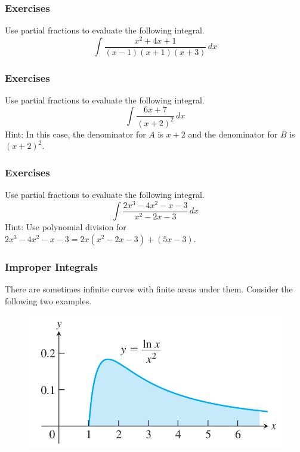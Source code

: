 \documentclass[xcolor=dvipsnames]{beamer}
\begin{document}
\begin{frame}
  \frametitle{Exercises}
  {\ubung} Use partial fractions to evaluate the following integral.
  \begin{equation}
    \label{eq:feirueho}
    \int\frac{x^{2}+4x+1}{(x-1)(x+1)(x+3)}\,dx
  \end{equation}
\end{frame}

\begin{frame}
  \frametitle{Exercises}
  {\ubung} Use partial fractions to evaluate the following integral.
  \begin{equation}
    \label{eq:ietahpha}
    \int\frac{6x+7}{\left(x+2\right)^{2}}\,dx
  \end{equation}
  Hint: In this case, the denominator for $A$ is $x+2$ and the
  denominator for $B$ is $\left(x+2\right)^{2}$.
\end{frame}

\begin{frame}
  \frametitle{Exercises}
  {\ubung} Use partial fractions to evaluate the following integral.
  \begin{equation}
    \label{eq:saeheing}
    \int\frac{2x^{3}-4x^{2}-x-3}{x^{2}-2x-3}\,dx
  \end{equation}
  Hint: Use polynomial division for
  $2x^{3}-4x^{2}-x-3=2x(x^{2}-2x-3)+(5x-3)$.
\end{frame}

\begin{frame}
  \frametitle{Improper Integrals}
  There are sometimes infinite curves with finite areas under them.
  Consider the following two examples. 
  \begin{figure}[h]
    \includegraphics[scale=0.4]{./diagrams/improper1.png}
  \end{figure}
\end{frame}
\end{document}
